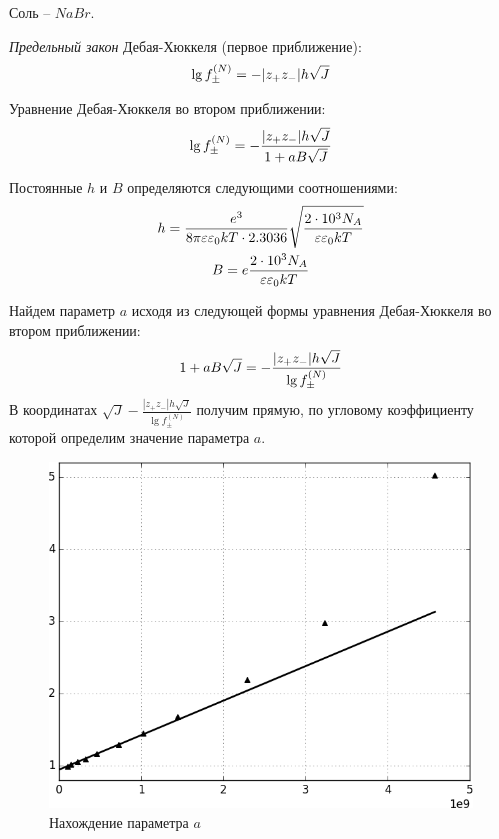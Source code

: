 \documentclass[13pt]{extarticle}
\begin{document}
 

Соль -- $NaBr$. \par
\textit{Предельный закон} Дебая-Хюккеля (первое приближение): 
\begin{gather}
	\lg f_{\pm}^{(N)} = - | z_+ z_- | h \sqrt{J} \notag
\end{gather}

Уравнение Дебая-Хюккеля во втором приближении:
\begin{gather}
	\lg f_{\pm}^{(N)} = - \frac{ | z_+ z_- | h \sqrt{J} }{ 1 + a B \sqrt{J} } \notag
\end{gather}

Постоянные $h$ и $B$ определяются следующими соотношениями:
\begin{gather}
h = \frac{e^3}{8 \pi \varepsilon \varepsilon_0 k T \cdot 2.3036} \sqrt{ \frac{2 \cdot 10^3 N_A }{ \varepsilon \varepsilon_0 k T} } \notag \\
B = e \frac{ 2 \cdot 10^3 N_A }{ \varepsilon \varepsilon_0 k T } \notag
\end{gather}

Найдем параметр $a$ исходя из следующей формы уравнения Дебая-Хюккеля во втором приближении:
\begin{gather}
	1 + a B \sqrt{J} = - \frac{ |z_+ z_-| h \sqrt{J} }{ \lg f_{\pm}^{(N)} } \notag
\end{gather}
В координатах $\displaystyle \sqrt{J} - \frac{ |z_+ z_-| h \sqrt{J} }{ \lg f_{\pm}^{(N)} }$ получим прямую, по угловому коэффициенту которой определим значение параметра $a$.

\begin{figure}[!ht]
\centering
\includegraphics[scale = 0.6]{../pictures/regr.png}
\caption{Нахождение параметра $a$}
\end{figure}
\end{document}
